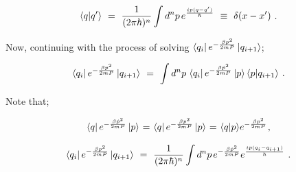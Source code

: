 \documentclass[11pt]{article}
\begin{document}
\begin{equation} \label{wr-eq-20-1}
\langle q | q' \rangle \hspace{0.125cm} = \hspace{0.125cm} \frac{1}{(2 \pi \hbar)^{n}} \int d^n p \hspace{0.05cm} e^{\frac{i p (q - q')}{\hbar}} \hspace{0.125cm} \equiv \hspace{0.125cm} \delta ( x - x' ) \hspace{0.125cm} .
\end{equation}

Now, continuing with the process of solving \begin{math} \bra{q_i} e^{ - \frac{ \beta p^2}{2 m P}} \ket{q_{i+1}} \end{math}; 

\begin{equation} \label{wr-eq-21-1}
\bra{q_i} e^{ - \frac{ \beta p^2}{2 m P}} \ket{q_{i+1}} \hspace{0.125cm} = \hspace{0.125cm} \int d^n p \hspace{0.05cm} \bra{q_i} e^{ - \frac{ \beta \hat{p}^2}{2 m P}} \ket{p} \langle p | q_{i+1} \rangle \hspace{0.125cm} .
\end{equation}

Note that;

\begin{equation} \label{wr-eq-22-1}
\bra{q} e^{ - \frac{ \beta \hat{p}^2}{2 m P}} \ket{p} \hspace{0.025cm} = \hspace{0.025cm} \bra{q} e^{ - \frac{ \beta p^2}{2 m P}} \ket{p} \hspace{0.025cm} = \hspace{0.025cm} \langle q | p \rangle e^{ - \frac{ \beta p^2}{2 m P}} \hspace{0.025cm} ,
\end{equation}

\begin{equation} \label{wr-eq-23-1}
\bra{q_i} e^{ - \frac{ \beta p^2}{2 m P}} \ket{q_{i+1}} \hspace{0.125cm} = \hspace{0.125cm} \frac{1}{(2 \pi \hbar)^{n}} \int d^n p \hspace{0.05cm} e^{{ - \frac{ \beta \hat{p}^2}{2 m P}}}  e^{{\frac{i p (q_i - q_{i+1})}{\hbar}}} \hspace{0.125cm} .
\end{equation}
\end{document}
